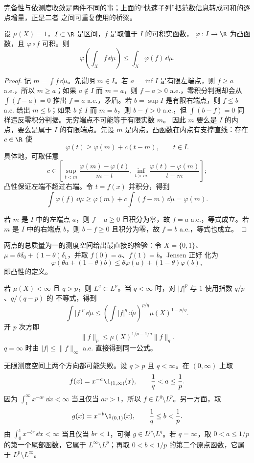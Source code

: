 完备性与依测度收敛是两件不同的事；上面的“快速子列”把范数信息转成可和的逐点增量，正是二者
之间可重复使用的桥梁。

\begin{proposition}\label{proposition:3-3-2-4}
设 $\mu(X)=1$，$I\subset\R$ 是区间，$f$ 是取值于 $I$ 的可积实函数，
$\varphi:I\to\R$ 为凸函数，且 $\varphi\circ f$ 可积。则
\[
  \varphi\left(\int_Xf\,\dd\mu\right)
  \le\int_X\varphi(f)\,\dd\mu.
\]
\end{proposition}

\begin{proof}
记 $m=\int f\,\dd\mu$。先说明 $m\in I$。若 $a=\inf I$ 是有限左端点，则
$f\ge a$ a.e.，所以 $m\ge a$；如果 $a\notin I$ 而 $m=a$，则 $f-a>0$ a.e.，零积分判据却会从
$\int(f-a)=0$ 推出 $f=a$ a.e.，矛盾。若 $b=\sup I$ 是有限右端点，则
$f\le b$ a.e. 给出 $m\le b$；如果 $b\notin I$ 而 $m=b$，则 $b-f>0$ a.e.，但
$\int(b-f)=0$ 同样违反零积分判据。无穷端点不可能等于有限实数 $m$。
因此 $m$ 要么是 $I$ 的内点，要么是属于 $I$ 的有限端点。先设 $m$ 是内点。凸函数在内点有支撑直线：存在
$c\in\R$ 使
\[
  \varphi(t)\ge\varphi(m)+c(t-m),
  \qquad t\in I.
\]
具体地，可取任意
\[
  c\in\left[
  \sup_{t<m}\frac{\varphi(m)-\varphi(t)}{m-t},
  \inf_{t>m}\frac{\varphi(t)-\varphi(m)}{t-m}
  \right];
\]
凸性保证左端不超过右端。令 $t=f(x)$ 并积分，得到
\[
 \int\varphi(f)\,\dd\mu
 \ge\varphi(m)+c\int(f-m)\,\dd\mu=\varphi(m).
\]

若 $m$ 是 $I$ 中的左端点 $a$，则 $f-a\ge0$ 且积分为零，故 $f=a$ a.e.，等式成立。若 $m$ 是
$I$ 中的右端点 $b$，则 $b-f\ge0$ 且积分为零，故 $f=b$ a.e.，等式也成立。
\end{proof}

两点的总质量为一的测度空间给出最直接的检验：令
$X=\{0,1\}$、$\mu=\theta\delta_0+(1-\theta)\delta_1$，并取
$f(0)=a$、$f(1)=b$。Jensen 正好
化为
\[
 \varphi(\theta a+(1-\theta)b)
 \le\theta\varphi(a)+(1-\theta)\varphi(b),
\]
即凸性的定义。

\begin{example}[有限测度嵌入]\label{ex:3-3-2-2}
若 $\mu(X)<\infty$ 且 $q>p$，则 $L^q\subset L^p$。当 $q<\infty$ 时，对
$|f|^p$ 与 $1$ 使用指数 $q/p$、$q/(q-p)$ 的 \Holder{} 不等式，得到
\[
 \int|f|^p\,\dd\mu
 \le\left(\int|f|^q\,\dd\mu\right)^{p/q}
      \mu(X)^{1-p/q}.
\]
开 $p$ 次方即
\[
  \|f\|_p\le\mu(X)^{1/p-1/q}\|f\|_q.
\]
$q=\infty$ 时由 $|f|\le\|f\|_\infty$ a.e. 直接得到同一公式。

无限测度空间上两个方向都可能失败。设 $q>p$ 且 $q<\infty$。在 $(0,\infty)$ 上取
\[
 f(x)=x^{-a}\1_{(1,\infty)}(x),
 \qquad \frac1q<a\le\frac1p.
\]
因为 $\int_1^\infty x^{-ar}\,\dd x<\infty$ 当且仅当 $ar>1$，所以
$f\in L^q\setminus L^p$。另一方面，取
\[
 g(x)=x^{-b}\1_{(0,1)}(x),
 \qquad \frac1q\le b<\frac1p.
\]
由 $\int_0^1x^{-br}\,\dd x<\infty$ 当且仅当 $br<1$，可得
$g\in L^p\setminus L^q$。若 $q=\infty$，取 $0<a\le1/p$ 的第一个尾部函数，它属于
$L^\infty\setminus L^p$；再取 $0<b<1/p$ 的第二个原点函数，它属于
$L^p\setminus L^\infty$。
\end{example}

